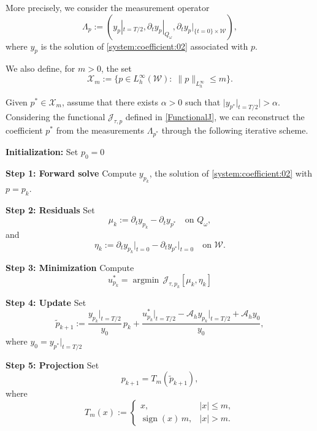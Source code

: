 \documentclass{amsart}
\numberwithin{equation}{section}
\begin{document}
More precisely, we consider the measurement operator 
 $$\Lambda_p:= (y_p|_{t=T/2},\partial_ty_p|_{Q_{\omega}},\partial_ty_p|_{\{t=0\}\times\mathcal{W}}),$$
 where $y_p$ is the solution of \eqref{system:coefficient:02} associated with $p$. 
 
We also define, for $m>0$, the set $$\mathcal{X}_{m}:= \{p\in L^{\infty}_h(\mathcal{W}):\;\|p\|_{L^{\infty}_h}\leq m\}.$$

Given $p^{\ast}\in \mathcal{X}_{m}$, assume that there exists $\alpha>0$ such that $\Big|y_{p^\ast}|_{t=T/2}\Big|>\alpha$. Considering the functional $\mathcal{J}_{\tau,p}$ defined in \eqref{FunctionalJ}, we can reconstruct the coefficient $p^{\ast}$ from the measurements $\Lambda_{p^{\ast}}$ through the following iterative scheme. 

\begin{algorithm}\label{Alporithmo_Reconstruccion}
\caption{Iterative Reconstruction of $p$}
\label{alg:pk_reconstruction}
\begin{algorithmic}
  \State \textbf{Initialization:}
  \State Set $p_{0}=0$
  \Statex

    \State \textbf{Step 1: Forward solve}
    \State Compute $y_{p_k}$, the solution of \eqref{system:coefficient:02} with $p=p_k$.
    
    \State \textbf{Step 2: Residuals}
    \State Set 
    \[
      \mu_k :=  \partial_t y_{p_k} - \partial_t y_{p^\ast}
      \quad \text{on } Q_\omega,
    \]
    and
    \[
      \eta_k :=  \partial_t y_{p_k}\Big|_{t=0} - \partial_t y_{p^\ast}\Big|_{t=0}
      \quad \text{on } \mathcal{W}.
    \]
    
    \State \textbf{Step 3: Minimization}
    \State Compute 
    \[
      u^\ast_{p_k} = \operatorname*{argmin}\,\mathcal{J}_{\tau,p_k}[\mu_k,\eta_k]
    \]
    
    \State \textbf{Step 4: Update}
    \State Set
    \[
      \tilde{p}_{k+1} :=  \frac{y_{p_k}\Big|_{t=T/2}}{y_0}\,p_k
      + \frac{u^\ast_{p_k}\Big|_{t=T/2} - \mathcal{A}_h y_{p_k}\Big|_{t=T/2} + \mathcal{A}_h y_0}{y_0},
    \]
    where $y_0 = y_{p^\ast}\Big|_{t=T/2}$
    
    \State \textbf{Step 5: Projection}
    \State Set
    \[
      p_{k+1} = T_m(\tilde{p}_{k+1}),
    \]
    where
    \[
      T_m(x) := 
      \begin{cases}
        x, & |x|\leq m,\\
        \operatorname{sign}(x)\,m, & |x|> m.
      \end{cases}
    \]
  \EndFor
\end{algorithmic}
\end{algorithm}
\end{document}
